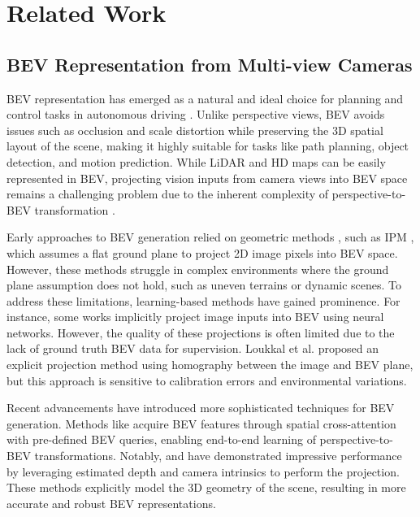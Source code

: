 \section{Related Work}
\label{sec:related}
\subsection{BEV Representation from Multi-view Cameras}
BEV representation has emerged as a natural and ideal choice for planning and control tasks in autonomous driving \cite{ng2020bev, zhang2021end, xu2024vlm, chitta2021neat}. Unlike perspective views, BEV avoids issues such as occlusion and scale distortion while preserving the 3D spatial layout of the scene, making it highly suitable for tasks like path planning, object detection, and motion prediction. While LiDAR and HD maps can be easily represented in BEV, projecting vision inputs from camera views into BEV space remains a challenging problem due to the inherent complexity of perspective-to-BEV transformation \cite{zhu2018generative}.

Early approaches to BEV generation relied on geometric methods \cite{mu2023inverse, kim2019deep}, such as IPM \cite{zhuravlev2023towards}, which assumes a flat ground plane to project 2D image pixels into BEV space. However, these methods struggle in complex environments where the ground plane assumption does not hold, such as uneven terrains or dynamic scenes. To address these limitations, learning-based methods have gained prominence. For instance, some works \cite{huang2021bevdet, pan2020cross} implicitly project image inputs into BEV using neural networks. However, the quality of these projections is often limited due to the lack of ground truth BEV data for supervision. Loukkal et al. \cite{loukkal2021driving} proposed an explicit projection method using homography between the image and BEV plane, but this approach is sensitive to calibration errors and environmental variations.

Recent advancements have introduced more sophisticated techniques for BEV generation. Methods like \cite{chen2022persformer,li2022bevformer} acquire BEV features through spatial cross-attention with pre-defined BEV queries, enabling end-to-end learning of perspective-to-BEV transformations. Notably, \cite{philion2020lift} and \cite{hu2021fiery} have demonstrated impressive performance by leveraging estimated depth and camera intrinsics to perform the projection. These methods explicitly model the 3D geometry of the scene, resulting in more accurate and robust BEV representations.

